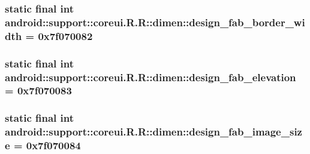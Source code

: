 \hypertarget{classandroid_1_1support_1_1coreui_1_1_r_1_1dimen_c204e398f83c17cafc1b52469c2258c7}{
\subsubsection[{design\_\-fab\_\-border\_\-width}]{\setlength{\rightskip}{0pt plus 5cm}static final int android::support::coreui.R.R::dimen::design\_\-fab\_\-border\_\-width = 0x7f070082}}
\label{classandroid_1_1support_1_1coreui_1_1_r_1_1dimen_c204e398f83c17cafc1b52469c2258c7}


\hypertarget{classandroid_1_1support_1_1coreui_1_1_r_1_1dimen_bee3858acec9ee83f5df82c2a8e315a8}{
\subsubsection[{design\_\-fab\_\-elevation}]{\setlength{\rightskip}{0pt plus 5cm}static final int android::support::coreui.R.R::dimen::design\_\-fab\_\-elevation = 0x7f070083}}
\label{classandroid_1_1support_1_1coreui_1_1_r_1_1dimen_bee3858acec9ee83f5df82c2a8e315a8}


\hypertarget{classandroid_1_1support_1_1coreui_1_1_r_1_1dimen_da2dfae5b1892187045b87cfc9272534}{
\subsubsection[{design\_\-fab\_\-image\_\-size}]{\setlength{\rightskip}{0pt plus 5cm}static final int android::support::coreui.R.R::dimen::design\_\-fab\_\-image\_\-size = 0x7f070084}}
\label{classandroid_1_1support_1_1coreui_1_1_r_1_1dimen_da2dfae5b1892187045b87cfc9272534}


